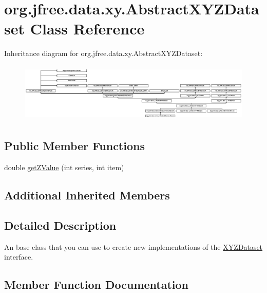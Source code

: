 \hypertarget{classorg_1_1jfree_1_1data_1_1xy_1_1_abstract_x_y_z_dataset}{}\section{org.\+jfree.\+data.\+xy.\+Abstract\+X\+Y\+Z\+Dataset Class Reference}
\label{classorg_1_1jfree_1_1data_1_1xy_1_1_abstract_x_y_z_dataset}
Inheritance diagram for org.\+jfree.\+data.\+xy.\+Abstract\+X\+Y\+Z\+Dataset\+:\begin{figure}[H]
\begin{center}
\leavevmode
\includegraphics[height=2.836879cm]{classorg_1_1jfree_1_1data_1_1xy_1_1_abstract_x_y_z_dataset}
\end{center}
\end{figure}
\subsection*{Public Member Functions}
\begin{DoxyCompactItemize}
\item 
double \mbox{\hyperlink{classorg_1_1jfree_1_1data_1_1xy_1_1_abstract_x_y_z_dataset_a797ce912ff2711ef1627c21db6ff50a7}{get\+Z\+Value}} (int series, int item)
\end{DoxyCompactItemize}
\subsection*{Additional Inherited Members}


\subsection{Detailed Description}
An base class that you can use to create new implementations of the \mbox{\hyperlink{interfaceorg_1_1jfree_1_1data_1_1xy_1_1_x_y_z_dataset}{X\+Y\+Z\+Dataset}} interface. 

\subsection{Member Function Documentation}
\mbox{\label{classorg_1_1jfree_1_1data_1_1xy_1_1_abstract_x_y_z_dataset_a797ce912ff2711ef1627c21db6ff50a7}} 
